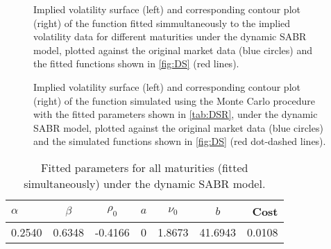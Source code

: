 \begin{figure}[H]
  \begin{subfigmatrix}{2}
  \end{subfigmatrix}
    \caption[Implied volatility surface and corresponding contour plot of the function fitted simmultaneously to the implied volatility data for different maturities under the dynamic SABR model, plotted against the original market data and the fitted functions shown in \autoref{fig:DS}.]{Implied volatility surface (left) and corresponding contour plot (right) of the function fitted simmultaneously to the implied volatility data for different maturities under the dynamic SABR model, plotted against the original market data (blue circles) and the fitted functions shown in \autoref{fig:DS} (red lines).}\label{fig:DSS}
\end{figure}   



\begin{figure}[H]
  \begin{subfigmatrix}{2}
  \end{subfigmatrix}
    \caption[Implied volatility surface and corresponding contour plot of the function simulated using the Monte Carlo procedure with the fitted parameters shown in \autoref{tab:DSR}, under the dynamic SABR model, plotted against the original market data and the simulated functions shown in \autoref{fig:DS}.]{Implied volatility surface (left) and corresponding contour plot (right) of the function simulated using the Monte Carlo procedure with the fitted parameters shown in \autoref{tab:DSR}, under the dynamic SABR model, plotted against the original market data (blue circles) and the simulated functions shown in \autoref{fig:DS} (red dot-dashed lines).}\label{fig:DSSSim}
\end{figure} 


\begin{table}[H]
    \centering
        \renewcommand{\arraystretch}{0.8}
\begin{tabular}{@{}lcccccr@{}}
\toprule
$\alpha$ & $\beta$ & $\rho_0$ & $a$ & $\nu_0$ & $b$ & Cost \\ \midrule
0.2540 & 0.6348 & -0.4166 & 0 & 1.8673 & 41.6943 & 0.0108 \\
\bottomrule
\end{tabular}
  \caption[Fitted parameters for all maturities (fitted simultaneously) under the dynamic SABR model.]{Fitted parameters for all maturities (fitted simultaneously) under the dynamic SABR model.}
  \label{tab:DSR}
\end{table}



